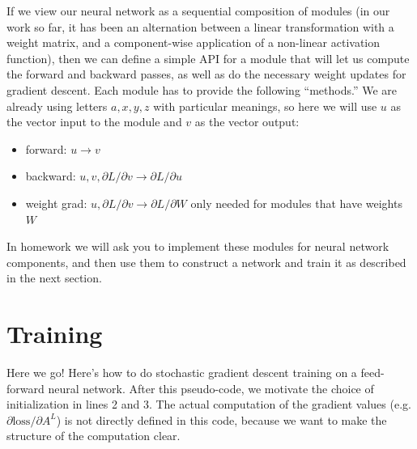 If we view our neural network as a sequential composition of modules
(in our work so far, it has been an alternation between a linear
transformation with a weight matrix, and a component-wise application
of a non-linear activation function), then we can define a simple API
for a module that will let us compute the forward and backward passes,
as well as do the necessary weight updates for gradient descent.  Each
module has to provide the following ``methods.''  We are already using
letters $a, x, y, z$ with particular meanings, so here we will use $u$
as the vector input to the module and $v$ as the vector output:
\begin{itemize}
  \item forward: $u \rightarrow v$
  \item backward: $u, v, \partial L /
    \partial v \rightarrow \partial L / \partial u$
  \item weight grad: $u, \partial L / \partial v \rightarrow \partial L
    / \partial W$  only needed for modules that have weights $W$
\end{itemize}
In homework we will ask you to implement these modules for neural
network components, and then use them to construct a network and train
it as described in the next section.



\section{Training}
Here we go!  Here's how to do stochastic gradient descent training on
a feed-forward neural network.   After this pseudo-code, we motivate
the choice of initialization in lines 2 and 3.  The actual
computation of the gradient values (e.g. $\partial\text{loss}/
\partial A^L$) is not directly defined in this code, because we want
to make the structure of the computation clear.

